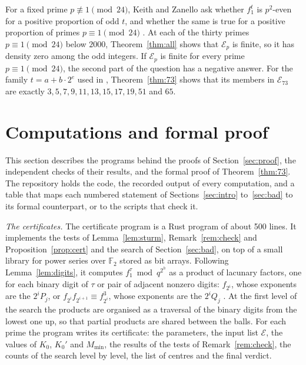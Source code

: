 \documentclass[12pt]{amsart}
\theoremstyle{definition}
\newcommand{\F}{\mathbb{F}_2}
\newcommand{\cE}{\mathcal{E}}
\newcommand{\computed}[2]{\ignorespaces}
\newcommand{\mapitem}[1]{\ignorespaces}
\begin{document}
For a fixed prime $p\not\equiv1\pmod{24}$, Keith and Zanello ask whether $f_1^t$ is $p^2$-even for a positive proportion of odd $t$, and whether the same is true for a positive proportion of primes $p\equiv1\pmod{24}$ \cite[Question~41]{KZ3}. At each of the thirty primes $p\equiv1\pmod{24}$ below $2000$, Theorem~\ref{thm:all} shows that $\cE_p$ is finite, so it has density zero among the odd integers. If $\cE_p$ is finite for every prime $p\equiv1\pmod{24}$, the second part of the question has a negative answer. For the family $t=a+b\cdot2^e$ used in \cite{KZ3}, Theorem~\ref{thm:73} shows that its members in $\cE_{73}$ are exactly $3,5,7,9,11,13,15,17,19,51$ and $65$.
\mapitem{Section~\ref{sec:remarks}, the members of the family $a+b\cdot2^e$ in $\mathcal{E}_{73}$}
\computed{gp -q paper/small_checks.gp, part 8}{paper/small_checks.out}

\section{Computations and formal proof}\label{sec:checks}

This section describes the programs behind the proofs of Section~\ref{sec:proof}, the independent checks of their results, and the formal proof of Theorem~\ref{thm:73}. The repository \cite{Rep} holds the code, the recorded output of every computation, and a table that maps each numbered statement of Sections~\ref{sec:intro} to~\ref{sec:bad} to its formal counterpart, or to the scripts that check it.

\emph{The certificates.} The certificate program is a Rust program of about 500 lines. It implements the tests of Lemma~\ref{lem:sturm}, Remark~\ref{rem:check} and Proposition~\ref{prop:cert} and the search of Section~\ref{sec:bad}, on top of a small library for power series over $\F$ stored as bit arrays. Following Lemma~\ref{lem:digits}, it computes $f_1^\tau\bmod q^{2^h}$ as a product of lacunary factors, one for each binary digit of $\tau$ or pair of adjacent nonzero digits: $f_{2^i}$, whose exponents are the $2^iP_j$, or $f_{2^i}f_{2^{i+1}}\equiv f_{2^i}^3$, whose exponents are the $2^iQ_j$ \cite[Theorem~27]{KZ3}. At the first level of the search the products are organised as a traversal of the binary digits from the lowest one up, so that partial products are shared between the balls. For each prime the program writes its certificate: the parameters, the input list $\cE$, the values of $K_0$, $K_0'$ and $M_{\min}$, the results of the tests of Remark~\ref{rem:check}, the counts of the search level by level, the list of centres and the final verdict.
\end{document}
